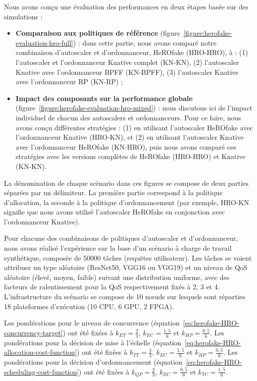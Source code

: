 Nous avons conçu une évaluation des performances en deux étapes basée sur des simulations :

\begin{itemize}
    \item \textbf{Comparaison aux politiques de référence} (figure~\ref{figure:herofake-evaluation-hro-full}) : dans cette partie, nous avons comparé notre combinaison d'autoscaler et d'ordonnanceur, HeROfake (HRO-HRO), à : (1) l'autoscaler et l'ordonnanceur Knative complet (KN-KN), (2) l'autoscaler Knative avec l'ordonnanceur BPFF (KN-BPFF), (3) l'autoscaler Knative avec l'ordonnanceur RP (KN-RP) ;
    \item \textbf{Impact des composants sur la performance globale} (figure~\ref{figure:herofake-evaluation-hro-mixed}) : nous discutons ici de l'impact individuel de chacun des autoscalers et ordonnanceurs. Pour ce faire, nous avons conçu différentes stratégies : (1) en utilisant l'autoscaler HeROfake avec l'ordonnanceur Knative (HRO-KN), et (2) en utilisant l'autoscaler Knative avec l'ordonnanceur HeROfake (KN-HRO), puis nous avons comparé ces stratégies avec les versions complètes de HeROfake (HRO-HRO) et Knative (KN-KN).
\end{itemize}

La dénomination de chaque scénario dans ces figures se compose de deux parties séparées par un délimiteur. La première partie correspond à la politique d'allocation, la seconde à la politique d'ordonnancement (par exemple, HRO-KN signifie que nous avons utilisé l'autoscaler HeROfake en conjonction avec l'ordonnanceur Knative).

Pour chacune des combinaisons de politiques d'autoscaler et d'ordonnanceur, nous avons réalisé l'expérience sur la base d'un scénario à charge de travail synthétique, composée de 50000 tâches (requêtes utilisateur). Les tâches se voient attribuer un type aléatoire (ResNet50, VGG16 ou VGG19) et un niveau de QoS aléatoire (élevé, moyen, faible) suivant une distribution uniforme, avec des facteurs de ralentissement pour la QoS respectivement fixés à 2, 3 et 4. L'infrastructure du scénario se compose de 10 nœuds sur lesquels sont réparties 18 plateformes d'exécution (10 CPU, 6 GPU, 2 FPGA).

Les pondérations pour le niveau de concurrence (équation~\ref{eq:herofake-HRO-concurrency-target}) ont été fixées à $k_{ET} = \frac{2}{3}$, $k_{EC} = \frac{1,5}{6}$ et $k_{HP} = \frac{0,5}{6}$. Les pondérations pour la décision de mise à l'échelle (équation~\ref{eq:herofake-HRO-allocation-cost-function}) ont été fixées à $k_{TT} = \frac{2}{3}$, $k_{EC} = \frac{1,5}{6}$ et $k_{HP} = \frac{0,5}{6}$. Les pondérations pour la décision d'ordonnancement (équation~\ref{eq:herofake-HRO-scheduling-cost-function}) ont été fixées à $k_{QP} = \frac{2}{3}$, $k_{EC} = \frac{0,5}{6}$ et $k_{TC} = \frac{1,5}{6}$.

